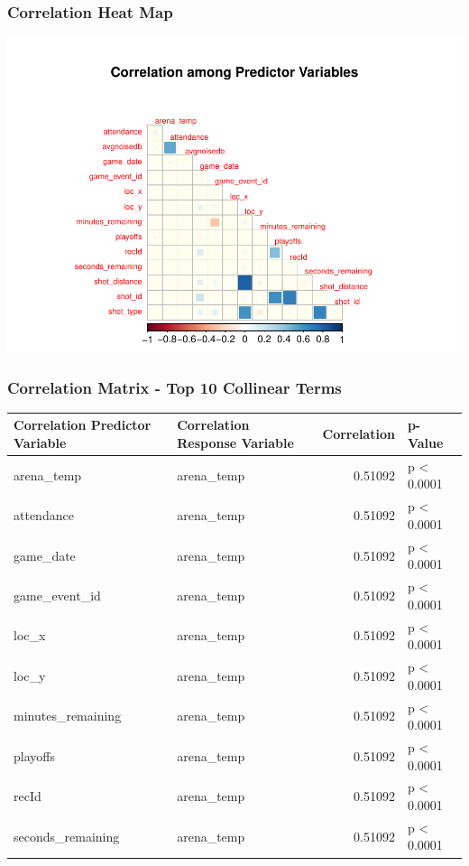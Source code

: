 \documentclass[american,]{article}
\begin{document}
\hypertarget{correlation-heat-map}{%
\subsubsection{Correlation Heat Map}\label{correlation-heat-map}}

\includegraphics{Final_Project_Applied_files/figure-latex/Heatmap for Appendix-1.pdf}

\hypertarget{correlation-matrix---top-10-collinear-terms}{%
\subsubsection{Correlation Matrix - Top 10 Collinear Terms}\label{correlation-matrix---top-10-collinear-terms}}

\begin{table}[!h]
\centering
\begin{tabular}{llrl}
\toprule
Correlation Predictor Variable & Correlation Response Variable & Correlation & p-Value\\
\midrule
arena\_temp & arena\_temp & 0.51092 & p < 0.0001\\
attendance & arena\_temp & 0.51092 & p < 0.0001\\
game\_date & arena\_temp & 0.51092 & p < 0.0001\\
game\_event\_id & arena\_temp & 0.51092 & p < 0.0001\\
loc\_x & arena\_temp & 0.51092 & p < 0.0001\\
\addlinespace
loc\_y & arena\_temp & 0.51092 & p < 0.0001\\
minutes\_remaining & arena\_temp & 0.51092 & p < 0.0001\\
playoffs & arena\_temp & 0.51092 & p < 0.0001\\
recId & arena\_temp & 0.51092 & p < 0.0001\\
seconds\_remaining & arena\_temp & 0.51092 & p < 0.0001\\
\bottomrule
\end{tabular}
\end{table}
\end{document}
